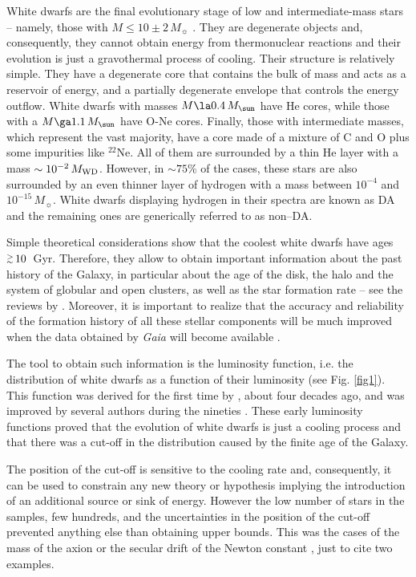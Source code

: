 \documentclass[useAMS,usenatbib]{mnras}
\newcommand{\gppr}{\stackrel{>}{\scriptstyle \sim}}
\newcommand{\gappr}{\raisebox{-0.4ex}{$\gppr$}}
\begin{document}
White   dwarfs  are   the  final   evolutionary  stage   of  low   and
intermediate-mass  stars  -- namely,  those  with  $M\leq 10\pm  2  \,
M_{\sun}$   \citep{alth10}.    They   are  degenerate   objects   and,
consequently, they  cannot obtain energy from  thermonuclear reactions
and their evolution is just  a gravothermal process of cooling.  Their
structure  is relatively  simple.  They  have a  degenerate core  that
contains the  bulk of mass  and acts as a  reservoir of energy,  and a
partially degenerate envelope that controls the energy outflow. White dwarfs 
 with masses $M\la 0.4  \, M_{\sun}$ have He  cores, while
those with  a $M \ga 1.1  \, M_{\sun}$ have O-Ne  cores. Finally, those
with intermediate  masses, which represent the vast  majority, have  a core
made of a mixture of C and O plus some impurities like $^{22}$Ne.  All
of them are surrounded by a thin  He layer with a mass $\sim 10^{-2}\,
M_{\rm WD}$.   However, in $\sim 75$\%  of the cases, these  stars are
also  surrounded by  an even  thinner layer  of hydrogen  with a  mass
between $10^{-4}$ and $10^{-15}\,  M_{\sun}$.  White dwarfs displaying
hydrogen in their spectra are known  as DA and the remaining ones are
generically referred to as non--DA.

Simple theoretical  considerations show that the  coolest white dwarfs
have ages  $\gappr \,10$~Gyr.  Therefore,  they allow to  obtain important
information about the past history  of the Galaxy, in particular about
the age of the disk, the halo and the system of globular and open clusters, as
well as the  star formation  rate -- see the reviews by 
\citet{koes90,iser98a,font01,koes02,hans03,hans04,alth10,iser13,garc16}.   
Moreover, it is  important to realize that the accuracy and  reliability  
of  the  formation  history  of  all  these  stellar components will be 
much improved when the data obtained by {\sl Gaia} will become available \citep{bars14}.

The tool to  obtain such information is the  luminosity function, i.e.
the distribution  of white dwarfs  as a function of  their luminosity (see Fig. \ref{fig1}). 
This function was derived for the first time by \citet{weid68}, about four decades ago, and 
was improved by several authors during the nineties \citep{lieb88,evan92,oswa96,legg98,knox99}. 
These early luminosity functions proved that the evolution of white dwarfs is just a cooling 
process and that there was a cut-off in the distribution caused by the finite age of the Galaxy.

The position of the cut-off is sensitive to the cooling rate and, consequently, it 
can be used to constrain any new theory  or hypothesis implying the introduction of an additional 
source or sink of energy. However the low number of stars in the samples, few hundreds, and 
the uncertainties in the position of the cut-off prevented anything else than obtaining upper 
bounds. This was the cases of the mass of the axion \citep{raff96} or the secular drift of the 
Newton constant \citep{garc95}, just to cite two examples. 
\end{document}
